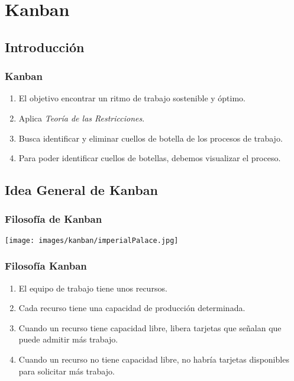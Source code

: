 \documentclass[animated,a4paper,slidestop,xcolor=pst,blue]{beamer}
\begin{document}
\section{Kanban}

\subsection{Introducción}

\begin{frame}[c]
    \frametitle{Kanban}
    \begin{enumerate}[<+->]
        \item El objetivo encontrar un ritmo de trabajo sostenible y óptimo.
        \item Aplica \emph{Teoría de las Restricciones}.
        \item Busca identificar y eliminar cuellos de botella de los procesos de trabajo.
        \item Para poder identificar cuellos de botellas, debemos visualizar el proceso.
    \end{enumerate}
\end{frame}

\subsection{Idea General de Kanban}

\begin{frame}[c]
	\frametitle{Filosofía de Kanban}
    \begin{center}
        \texttt{[image: images/kanban/imperialPalace.jpg]}
    \end{center}
\end{frame}

\begin{frame}[c]
    \frametitle{Filosofía Kanban}
    \begin{enumerate}[<+->]
        \item El equipo de trabajo tiene unos recursos.
        \item Cada recurso tiene una capacidad de producción determinada.
        \item Cuando un recurso tiene capacidad libre, libera tarjetas que señalan que puede admitir más trabajo.
        \item Cuando un recurso no tiene capacidad libre, no habría tarjetas disponibles para solicitar más trabajo.
    \end{enumerate}
\end{frame}
\end{document}
